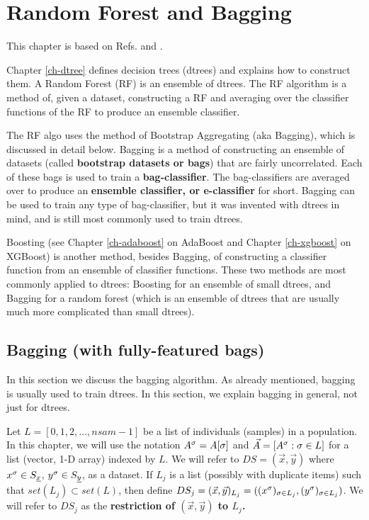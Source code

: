 \chapter{Random Forest and Bagging}
\label{ch-rforest}


This chapter
is based on Refs.\cite{wiki-bagging}
and \cite{wiki-rforest}.

Chapter \ref{ch-dtree}
defines decision trees (dtrees)
and explains how to construct them.
A Random Forest (RF) is 
an ensemble
of dtrees.
The RF algorithm is a
method of,
given a dataset,
constructing a RF
and averaging
over the classifier 
functions of the RF
to produce
an ensemble classifier.


The RF algo
uses  the method of 
Bootstrap Aggregating
(aka Bagging), which 
is discussed in detail below.
Bagging
is a method
of constructing
an ensemble
of datasets (called {\bf bootstrap
datasets or bags})
that are 
fairly uncorrelated.
Each of
these bags is used to
train a {\bf bag-classifier}.
The bag-classifiers
are averaged over
to produce an {\bf
ensemble classifier,
or e-classifier} for short.
Bagging can be used
to
train any type
of bag-classifier,
but it was 
invented with
dtrees
in mind, 
and is still
 most commonly
used to train dtrees.

Boosting
(see Chapter \ref{ch-adaboost} on AdaBoost
and
Chapter \ref{ch-xgboost} on XGBoost)
is
another method,
besides Bagging,
of constructing a classifier function
from an ensemble 
of classifier functions.
These two methods are most commonly
applied to dtrees: Boosting for an ensemble of
small dtrees, and Bagging for a
random forest (which
is an ensemble
of dtrees that are 
usually much more
complicated than small dtrees).



\section{Bagging (with fully-featured bags)}
In this section
we discuss the bagging
algorithm.
As already 
mentioned,
bagging
is usually
used to train dtrees.
In this
section,
we explain bagging
in general,
not just for dtrees.


Let $L=[0,1,2, \ldots, nsam-1]$ be a list of
individuals (samples) in a population.
In this chapter, we will use the notation 
$A^\sigma=A[\sigma]$ 
and $\vec{A}=[A^\sigma:\sigma\in L]$
for a  list (vector, 1-D  array) indexed by $L$.
We will refer to $DS=(\vec{x}, \vec{y})$ 
where $x^\sigma\in S_{\underline{x}}$, $y^\sigma\in S_{\underline{y}}$,
as a dataset. If
$L_j$ is a list (possibly with 
duplicate items)
such that $set(L_j)\subset set(L)$,
 then
define
$DS_j=(\vec{x}, \vec{y})_{L_j}=
((x^\sigma)_{\sigma\in L_j}, 
(y^\sigma)_{\sigma\in L_j})$.
We will
refer to $DS_j$
as the {\bf restriction of 
$(\vec{x}, \vec{y})$ to $L_j$.}



